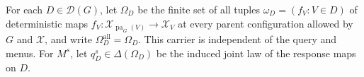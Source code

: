For each \(D\in\mathcal D(G)\), let \(\Omega_D\) be the finite set of all tuples \(\omega_D=(f_V:V\in D)\) of deterministic maps \(f_V:\mathcal X_{\operatorname{pa}_G(V)}\to\mathcal X_V\) at every parent configuration allowed by \(G\) and \(\mathcal X\), and write \(\Omega_D^{\mathrm{all}}=\Omega_D\).  This carrier is independent of the query and menus.  For \(M^s\), let \(q_D^s\in\Delta(\Omega_D)\) be the induced joint law of the response maps on \(D\).